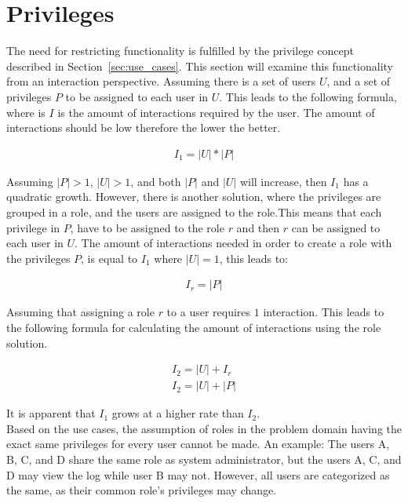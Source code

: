 \section{Privileges}
\label{sec:privileges}
The need for restricting functionality is fulfilled by the privilege concept described in Section~\ref{sec:use_cases}.
This section will examine this functionality from an interaction perspective.
Assuming there is a set of users $U$, and a set of privileges $P$ to be assigned to each user in $U$.
This leads to the following formula, where is $I$ is the amount of interactions required by the user.
The amount of interactions should be low therefore the lower the better.

\begin{align}
I_1 = |U|*|P|
\end{align}

Assuming $|P| > 1$, $|U| > 1$, and both $|P|$ and $|U|$ will increase, then $I_1$ has a quadratic growth.
However, there is another solution, where the privileges are grouped in a role, and the users are assigned to the role.This means that each privilege in $P$, have to be assigned to the role $r$ and then $r$ can be assigned to each user in $U$.
The amount of interactions needed in order to create a role with the privileges $P$, is equal to $I_1$ where $|U| = 1$, this leads to:

\begin{align}
I_r = |P|
\end{align}

Assuming that assigning a role $r$ to a user requires $1$ interaction.
This leads to the following formula for calculating the amount of interactions using the role solution.

\begin{align}
I_2 = |U|+I_r \\
I_2 = |U|+|P|
\end{align}

It is apparent that $I_1$ grows at a higher rate than $I_2$. \\

Based on the use cases, the assumption of roles in the problem domain having the exact same privileges for every user cannot be made.
An example: The users A, B, C, and D share the same role as system administrator, but the users A, C, and D may view the log while user B may not.
However, all users are categorized as the same, as their common role's privileges may change. \\

